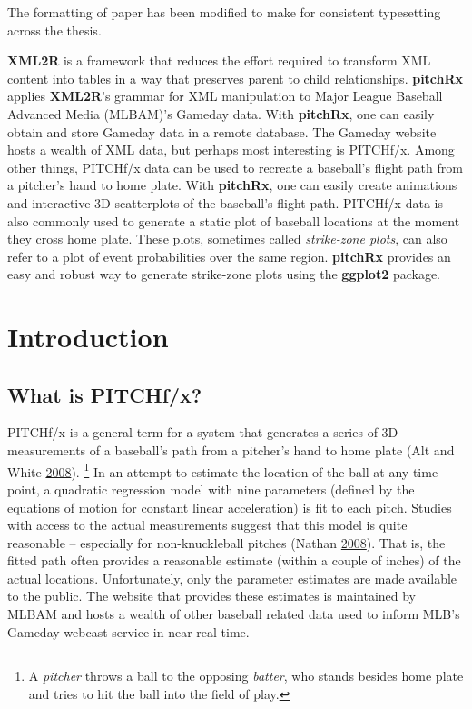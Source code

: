\documentclass[12pt,]{isuthesis}
\let\rmarkdownfootnote\footnote%
\def\footnote{\protect\rmarkdownfootnote}
\begin{document}
The formatting of paper has been modified to make for consistent
typesetting across the thesis.


\textbf{XML2R} is a framework that reduces the effort required to
transform XML content into tables in a way that preserves parent to
child relationships. \textbf{pitchRx} applies \textbf{XML2R}'s grammar
for XML manipulation to Major League Baseball Advanced Media (MLBAM)'s
Gameday data. With \textbf{pitchRx}, one can easily obtain and store
Gameday data in a remote database. The Gameday website hosts a wealth of
XML data, but perhaps most interesting is PITCHf/x. Among other things,
PITCHf/x data can be used to recreate a baseball's flight path from a
pitcher's hand to home plate. With \textbf{pitchRx}, one can easily
create animations and interactive 3D scatterplots of the baseball's
flight path. PITCHf/x data is also commonly used to generate a static
plot of baseball locations at the moment they cross home plate. These
plots, sometimes called \textit{strike-zone plots}, can also refer to a
plot of event probabilities over the same region. \textbf{pitchRx}
provides an easy and robust way to generate strike-zone plots using the
\textbf{ggplot2} package.

\section{Introduction}\label{introduction}

\subsection{What is PITCHf/x?}\label{what-is-pitchfx}

PITCHf/x is a general term for a system that generates a series of 3D
measurements of a baseball's path from a pitcher's hand to home plate
(Alt and White \protect\hyperlink{ref-patent}{2008}).
\footnote{A \textit{pitcher} throws a ball to the opposing \textit{batter}, who
stands besides home plate and tries to hit the ball into the field
of play.
} In an attempt to estimate the location of the ball at any time point,
a quadratic regression model with nine parameters (defined by the
equations of motion for constant linear acceleration) is fit to each
pitch. Studies with access to the actual measurements suggest that this
model is quite reasonable -- especially for non-knuckleball pitches
(Nathan \protect\hyperlink{ref-trajecoryAnalysis}{2008}). That is, the
fitted path often provides a reasonable estimate (within a couple of
inches) of the actual locations. Unfortunately, only the parameter
estimates are made available to the public. The website that provides
these estimates is maintained by MLBAM and hosts a wealth of other
baseball related data used to inform MLB's Gameday webcast service in
near real time.
\end{document}
